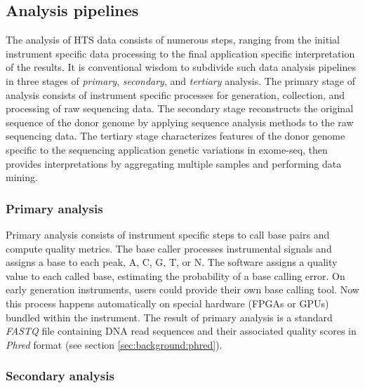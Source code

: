 \subsection{Analysis pipelines}

The analysis of HTS data consists of numerous steps, ranging from the initial instrument specific data processing to the final application specific interpretation of the results.
It is conventional wisdom to subdivide such data analysis pipelines in three stages of \emph{primary}, \emph{secondary}, and \emph{tertiary} analysis.
The primary stage of analysis consists of instrument specific processes for generation, collection, and processing of raw sequencing data.
The secondary stage reconstructs the original sequence of the donor genome by applying sequence analysis methods to the raw sequencing data.
The tertiary stage characterizes features of the donor genome specific to the sequencing application \eg genetic variations in exome-seq, then provides interpretations \eg by aggregating multiple samples and performing data mining.


\subsubsection{Primary analysis}

Primary analysis consists of instrument specific steps to call base pairs and compute quality metrics.
The base caller processes instrumental signals and assigns a base to each peak, \ie A, C, G, T, or N.
The software assigns a quality value to each called base, estimating the probability of a base calling error.
On early generation instruments, users could provide their own base calling tool.
Now this process happens automatically on special hardware (\eg FPGAs or GPUs) bundled within the instrument.
The result of primary analysis is a standard \emph{FASTQ} file containing DNA read sequences and their associated quality scores in \emph{Phred} format (see section \ref{sec:background:phred}).

\subsubsection{Secondary analysis}


